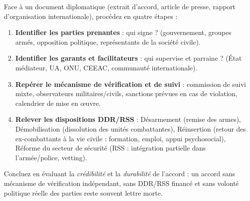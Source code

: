 \documentclass[11pt]{article}
\newcommand{\cle}[1]{{\popxbold\color{popdark}#1}}
\begin{document}
\begin{methode}
Face à un document diplomatique (extrait d'accord, article de presse, rapport d'organisation internationale), procédez en quatre étapes :
\begin{enumerate}
\item \textbf{Identifier les parties prenantes} : qui signe ? (gouvernement, groupes armés, opposition politique, représentants de la société civile).
\item \textbf{Identifier les garants et facilitateurs} : qui supervise et parraine ? (État médiateur, UA, ONU, CEEAC, communauté internationale).
\item \textbf{Repérer le mécanisme de vérification et de suivi} : commission de suivi mixte, observateurs militaires/civils, sanctions prévues en cas de violation, calendrier de mise en œuvre.
\item \textbf{Relever les dispositions DDR/RSS} : \cle{Désarmement} (remise des armes), \cle{Démobilisation} (dissolution des unités combattantes), \cle{Réinsertion} (retour des ex-combattants à la vie civile : formation, emploi, appui psychosocial), \cle{Réforme du secteur de sécurité} (RSS : intégration partielle dans l'armée/police, vetting).
\end{enumerate}
Concluez en évaluant la \emph{crédibilité} et la \emph{durabilité} de l'accord : un accord sans mécanisme de vérification indépendant, sans DDR/RSS financé et sans volonté politique réelle des parties reste souvent lettre morte.
\end{methode}
\end{document}
